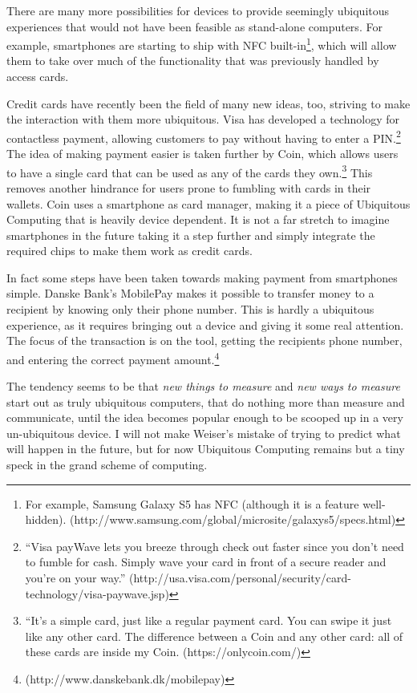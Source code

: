 There are many more possibilities for devices to provide seemingly ubiquitous experiences that would not have been feasible as stand-alone
computers. For example, smartphones are starting to ship with NFC built-in\footnote{For example, Samsung Galaxy S5 has NFC (although it is
a feature well-hidden). (http://www.samsung.com/global/microsite/galaxys5/specs.html)}, which will allow them to take over much of the
functionality that was previously handled by access cards.

Credit cards have recently been the field of many new ideas, too, striving to make the interaction with them more ubiquitous. Visa has developed
a technology for contactless payment, allowing customers to pay without having to enter a PIN.\footnote{``Visa payWave lets you breeze through
check out faster since you don't need to fumble for cash. Simply wave your card in front of a secure reader and you’re on your way.''
(http://usa.visa.com/personal/security/card-technology/visa-paywave.jsp)} The idea of making payment easier is taken further by Coin, which
allows users to have a single card that can be used as any of the cards they own.\footnote{``It's a simple card, just like a regular payment
card. You can swipe it just like any other card. The difference between a Coin and any other card: all of these cards are inside my Coin.
(https://onlycoin.com/)} This removes another hindrance for users prone to fumbling with cards in their wallets. Coin uses a smartphone as card
manager, making it a piece of Ubiquitous Computing that is heavily device dependent. It is not a far stretch to imagine smartphones in the
future taking it a step further and simply integrate the required chips to make them work as credit cards.

In fact some steps have been taken towards making payment from smartphones simple. Danske Bank's MobilePay makes it possible to transfer money
to a recipient by knowing only their phone number. This is hardly a ubiquitous experience, as it requires bringing out a device and giving it
some real attention. The focus of the transaction is on the tool, getting the recipients phone number, and entering the correct payment
amount.\footnote{(http://www.danskebank.dk/mobilepay)}

The tendency seems to be that \emph{new things to measure} and \emph{new ways to measure} start out as truly ubiquitous computers, that do
nothing more than measure and communicate, until the idea becomes popular enough to be scooped up in a very un-ubiquitous device. I will
not make Weiser's mistake of trying to predict what will happen in the future, but for now Ubiquitous Computing remains but a tiny speck in the
grand scheme of computing.

